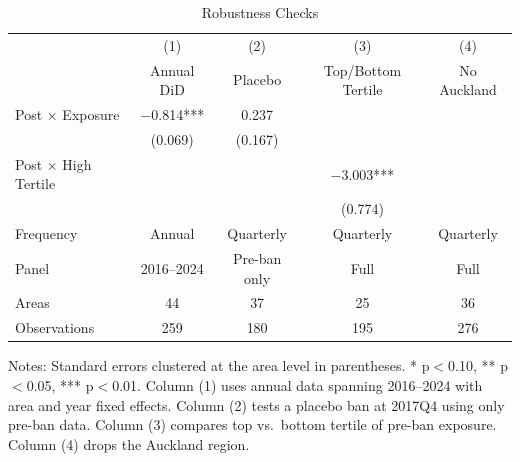 \begin{table}[H]
\centering
\caption{Robustness Checks}
\begin{threeparttable}
\begin{tabular}{lcccc}
\toprule
& (1) & (2) & (3) & (4) \\
& Annual DiD & Placebo & Top/Bottom Tertile & No Auckland \\
\midrule
Post $\times$ Exposure & $-$0.814*** & 0.237 & & \\
& (0.069) & (0.167) & & \\[6pt]
Post $\times$ High Tertile & & & $-$3.003*** & \\
& & & (0.774) & \\[6pt]
Frequency & Annual & Quarterly & Quarterly & Quarterly \\
Panel & 2016--2024 & Pre-ban only & Full & Full \\
Areas & 44 & 37 & 25 & 36 \\
Observations & 259 & 180 & 195 & 276 \\
\bottomrule
\end{tabular}
\begin{tablenotes}[flushleft]
\small
\item Notes: Standard errors clustered at the area level in parentheses. * p$<$0.10, ** p$<$0.05, *** p$<$0.01. Column (1) uses annual data spanning 2016--2024 with area and year fixed effects. Column (2) tests a placebo ban at 2017Q4 using only pre-ban data. Column (3) compares top vs.\ bottom tertile of pre-ban exposure. Column (4) drops the Auckland region.
\end{tablenotes}
\end{threeparttable}
\label{tab:robustness}
\end{table}
